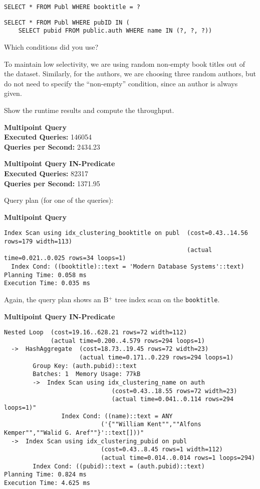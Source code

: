 \documentclass[11pt]{scrartcl}
\begin{document}
\begin{lstlisting}[style=dbtsql]
SELECT * FROM Publ WHERE booktitle = ?
\end{lstlisting}

\begin{lstlisting}[style=dbtsql]
SELECT * FROM Publ WHERE pubID IN (
    SELECT pubid FROM public.auth WHERE name IN (?, ?, ?))
\end{lstlisting}


Which conditions did you use?

To maintain low selectivity, we are using random non-empty book titles out of the dataset.
Similarly, for the authors, we are choosing three random authors, but do not need to specify the \enquote{non-empty}
condition, since an author is always given.

Show the runtime results and compute the throughput.

\textbf{Multipoint Query}\\
\textbf{Executed Queries: } 146054\\
\textbf{Queries per Second: } 2434.23

\textbf{Multipoint Query IN-Predicate}\\
\textbf{Executed Queries: } 82317\\
\textbf{Queries per Second: } 1371.95

Query plan (for one of the queries):

\textbf{Multipoint Query}
{\small
\parskip0pt\begin{verbatim}
Index Scan using idx_clustering_booktitle on publ  (cost=0.43..14.56 rows=179 width=113)
                                                   (actual time=0.021..0.025 rows=34 loops=1)
  Index Cond: ((booktitle)::text = 'Modern Database Systems'::text)
Planning Time: 0.058 ms
Execution Time: 0.035 ms
\end{verbatim}}

Again, the query plan shows an B$^+$ tree index scan on the \texttt{booktitle}.

\textbf{Multipoint Query IN-Predicate}
{\small
\parskip0pt\begin{verbatim}
Nested Loop  (cost=19.16..628.21 rows=72 width=112)
             (actual time=0.200..4.579 rows=294 loops=1)
  ->  HashAggregate  (cost=18.73..19.45 rows=72 width=23)
                     (actual time=0.171..0.229 rows=294 loops=1)
        Group Key: (auth.pubid)::text
        Batches: 1  Memory Usage: 77kB
        ->  Index Scan using idx_clustering_name on auth
                              (cost=0.43..18.55 rows=72 width=23)
                              (actual time=0.041..0.114 rows=294 loops=1)"
                Index Cond: ((name)::text = ANY
                           ('{""William Kent"",""Alfons Kemper"",""Walid G. Aref""}'::text[]))"
  ->  Index Scan using idx_clustering_pubid on publ
                           (cost=0.43..8.45 rows=1 width=112)
                           (actual time=0.014..0.014 rows=1 loops=294)
        Index Cond: ((pubid)::text = (auth.pubid)::text)
Planning Time: 0.824 ms
Execution Time: 4.625 ms
\end{verbatim}}
\end{document}
